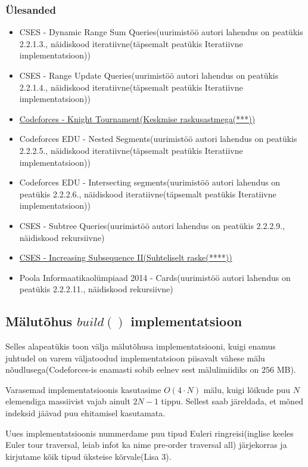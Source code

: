\documentclass{trkut}
\theoremstyle{definition}
\begin{document}
\subsubsection{Ülesanded}
\begin{itemize}
    \item CSES - Dynamic Range Sum Queries(uurimistöö autori lahendus on peatükis 2.2.1.3., näidiskood iteratiivne(täpsemalt peatükis Iteratiivne implementatsioon))
    \item CSES - Range Update Queries(uurimistöö autori lahendus on peatükis 2.2.1.4., näidiskood iteratiivne(täpsemalt peatükis Iteratiivne implementatsioon))
    \item \href{https://codeforces.com/problemset/problem/356/A}{Codeforces - Knight Tournament(Keskmise raskusastmega(***))}
    \item Codeforces EDU - Nested Segments(uurimistöö autori lahendus on peatükis 2.2.2.5., näidiskood iteratiivne(täpsemalt peatükis Iteratiivne implementatsioon))
    \item Codeforces EDU - Intersecting segments(uurimistöö autori lahendus on peatükis 2.2.2.6., näidiskood iteratiivne(täpsemalt peatükis Iteratiivne implementatsioon))
    \item CSES - Subtree Queries(uurimistöö autori lahendus on peatükis 2.2.2.9., näidiskood rekursiivne)
    \item \href{https://cses.fi/problemset/task/1748}{CSES - Increasing Subsequence II(Suhteliselt raske(****))}
    \item Poola Informaatikaolümpiaad 2014 - Cards(uurimistöö autori lahendus on peatükis 2.2.2.11., näidiskood rekursiivne)
\end{itemize}
\subsection{Mälutõhus $build()$ implementatsioon}

Selles alapeatükis toon välja mälutõhusa implementatsiooni, kuigi enamus juhtudel on varem väljatoodud implementatsioon piisavalt vähese mälu nõudlusega(Codeforces-is enamasti sobib eelnev sest mälulimiidiks on $256$ MB).

Varasemad implementatsioonis kasutasime $O(4\cdot N)$ mälu, kuigi lõikude puu $N$ elemendiga massiivist vajab ainult $2N-1$ tippu. Sellest saab järeldada, et mõned indeksid jäävad puu ehitamisel kasutamata. \parencite{EMaxx}

Uues implementatsioonis nummerdame puu tipud Euleri ringreisi(inglise keeles Euler tour traversal, leiab infot ka nime pre-order traversal all) järjekorras ja kirjutame kõik tipud üksteise kõrvale(Lisa 3).
\end{document}
